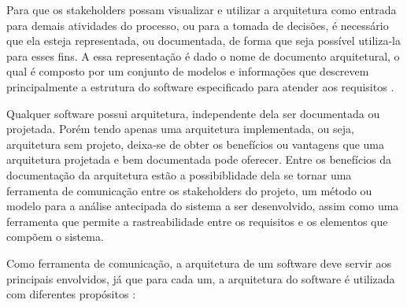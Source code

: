Para que os stakeholders possam visualizar e utilizar a arquitetura como entrada para demais atividades do processo, ou para a tomada de decisões, é necessário que ela esteja representada, ou documentada, de forma que seja possível utiliza-la para esses fins. A essa representação é dado o nome de documento arquitetural, o qual é composto por um conjunto de modelos e informações que descrevem principalmente a estrutura do software especificado para atender aos requisitos \cite{hilliard2000ieee}.

Qualquer software possui arquitetura, independente dela ser documentada ou projetada. Porém tendo apenas uma arquitetura implementada, ou seja, arquitetura sem projeto, deixa-se de obter os benefícios ou vantagens que uma arquitetura projetada e bem documentada pode oferecer. Entre os benefícios da documentação da arquitetura estão a possibiblidade dela se tornar uma ferramenta de comunicação entre os stakeholders do projeto, um método ou modelo para a análise antecipada do sistema a ser desenvolvido, assim como uma ferramenta que permite a rastreabilidade entre os requisitos e os elementos que compõem o sistema.

Como ferramenta de comunicação, a arquitetura de um software deve servir aos principais envolvidos, já que para cada um, a arquitetura do software é utilizada com diferentes propósitos \cite{gacek1995definition, xavier2001criaccao, clements2002documenting}:

